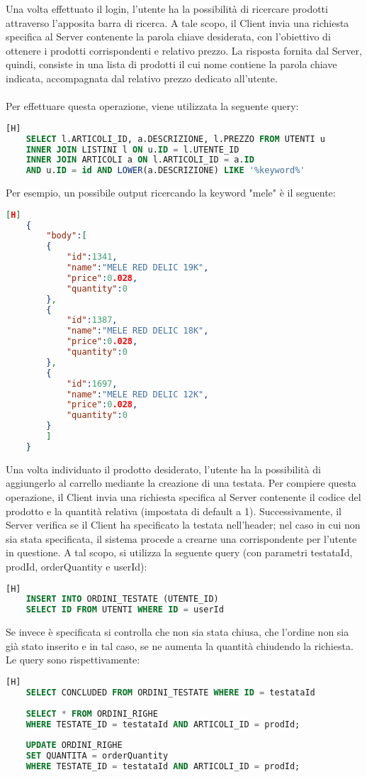 \noindent
Una volta effettuato il login, l'utente ha la possibilità di ricercare prodotti attraverso l'apposita barra di ricerca. A tale scopo, il Client invia una richiesta specifica al Server contenente la parola chiave desiderata, con l'obiettivo di ottenere i prodotti corrispondenti e relativo prezzo. La risposta fornita dal Server, quindi, consiste in una lista di prodotti il cui nome contiene la parola chiave indicata, accompagnata dal relativo prezzo dedicato all'utente.\\
\\
Per effettuare questa operazione, viene utilizzata la seguente query:
\begin{lstlisting}[language=sql] [H]
	SELECT l.ARTICOLI_ID, a.DESCRIZIONE, l.PREZZO FROM UTENTI u
	INNER JOIN LISTINI l ON u.ID = l.UTENTE_ID
	INNER JOIN ARTICOLI a ON l.ARTICOLI_ID = a.ID 
	AND u.ID = id AND LOWER(a.DESCRIZIONE) LIKE '%keyword%'
\end{lstlisting}

\noindent
Per esempio, un possibile output ricercando la keyword "mele" è il seguente:
\begin{lstlisting}[language=json] [H]
	{
		"body":[
		{
			"id":1341,
			"name":"MELE RED DELIC 19K",
			"price":0.028,
			"quantity":0
		},
		{
			"id":1387,
			"name":"MELE RED DELIC 18K",
			"price":0.028,
			"quantity":0
		},
		{
			"id":1697,
			"name":"MELE RED DELIC 12K",
			"price":0.028,
			"quantity":0
		}
		]
	}
\end{lstlisting}

\noindent
Una volta individuato il prodotto desiderato, l'utente ha la possibilità di aggiungerlo al carrello mediante la creazione di una testata. Per compiere questa operazione, il Client invia una richiesta specifica al Server contenente il codice del prodotto e la quantità relativa (impostata di default a 1).
Successivamente, il Server verifica se il Client ha specificato la testata nell'header; nel caso in cui non sia stata specificata, il sistema procede a crearne una corrispondente per l'utente in questione. A tal scopo, si utilizza la seguente query (con parametri testataId, prodId, orderQuantity e userId):
\begin{lstlisting}[language=sql, firstnumber=1] [H]
	INSERT INTO ORDINI_TESTATE (UTENTE_ID) 
	SELECT ID FROM UTENTI WHERE ID = userId
\end{lstlisting}

\noindent
Se invece è specificata si controlla che non sia stata chiusa, che l'ordine non sia già stato inserito e in tal caso, se ne aumenta la quantità chiudendo la richiesta.
Le query sono rispettivamente:
\begin{lstlisting}[language=sql, firstnumber=1] [H]
	SELECT CONCLUDED FROM ORDINI_TESTATE WHERE ID = testataId
	
	SELECT * FROM ORDINI_RIGHE 
	WHERE TESTATE_ID = testataId AND ARTICOLI_ID = prodId;
	
	UPDATE ORDINI_RIGHE
	SET QUANTITA = orderQuantity
	WHERE TESTATE_ID = testataId AND ARTICOLI_ID = prodId;
\end{lstlisting}

